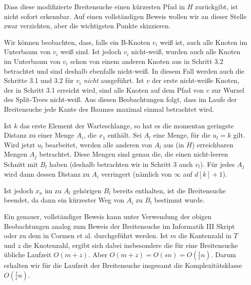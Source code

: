     Dass diese modifizierte Breitensuche einen kürzesten Pfad in $H$ zurückgibt, ist nicht sofort erkennbar. 
    Auf einen vollständigen Beweis wollen wir an dieser Stelle zwar verzichten, aber die wichtigsten Punkte skizzieren. 
       
    Wir können beobachten, dass, falls ein B-Knoten $v_i$ weiß ist, auch alle Knoten im Unterbaum von $v_i$ weiß sind. 
    Ist jedoch $v_i$ nicht-weiß, wurden auch alle Knoten im Unterbaum von $v_i$ schon von einem anderen Knoten aus in Schritt 3.2 betrachtet und sind deshalb ebenfalls nicht-weiß. In diesem Fall werden auch die Schritte 3.1 und 3.2 für $v_i$ \emph{nicht} ausgeführt.
    Ist $v$ der erste nicht-weiße Knoten, der in Schritt 3.1 erreicht wird, sind alle Knoten auf dem Pfad von $v$ zur Wurzel des Split-Trees nicht-weiß. 
    Aus diesen Beobachtungen folgt, dass im Laufe der Breitensuche jede Kante des Baumes maximal einmal betrachtet wird.
   
    Ist $k$ das erste Element der Warteschlange, so hat es die momentan geringste Distanz zu einer Menge $A_i$, die $x_1$ enthält. Sei $A_l$ eine Menge, für die $u_l = k$ gilt. 
    Wird jetzt $u_l$ bearbeitet, werden alle anderen von $A_l$ aus (in $H$) erreichbaren Mengen $A_j$ betrachtet. 
    Diese Mengen sind genau die, die einen nicht-leeren Schnitt mit $B_l$ haben (deshalb betrachten wir in Schritt 3 auch $v_l$). 
	Für jedes $A_j$ wird dann dessen Distanz zu $A_i$ verringert (nämlich von $\infty$ auf $d[k]+1$). 
    
    Ist jedoch $x_n$ im zu $A_l$ gehörigen $B_l$ bereits enthalten, ist die Breitensuche beendet, da dann ein kürzester Weg von $A_i$ zu $B_l$ bestimmt wurde.
    
    Ein genauer, vollständiger Beweis kann unter Verwendung der obigen Beobachtungen analog zum Beweis der Breitensuche im Informatik III Skript \cite{hagerup} oder zu dem in Cormen et al. \cite{cormen} durchgeführt werden. 
    Ist $m$ die Kantenzahl in $T$ und $z$ die Knotenzahl, ergibt sich dabei insbesondere die für eine Breitensuche übliche Laufzeit $O(m + z)$. 
    Aber $O(m + z) = O(sn) = O(\frac{t}{\epsilon}n)$. Darum erhalten wir für die Laufzeit der Breitensuche insgesamt die Komplexitätsklasse $O(\frac{t}{\epsilon}n)$.
    
